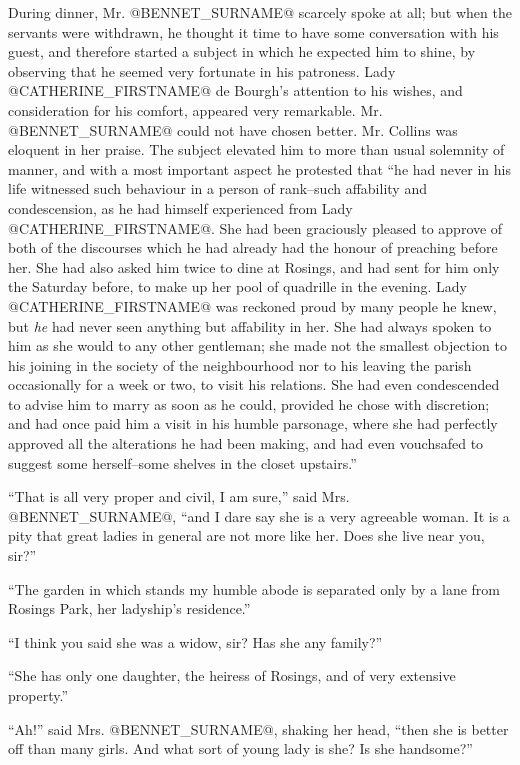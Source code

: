 During dinner, Mr. @BENNET_SURNAME@ scarcely spoke at all; but when the servants
were withdrawn, he thought it time to have some conversation with his
guest, and therefore started a subject in which he expected him to
shine, by observing that he seemed very fortunate in his patroness. Lady
@CATHERINE_FIRSTNAME@ de Bourgh's attention to his wishes, and consideration for
his comfort, appeared very remarkable. Mr. @BENNET_SURNAME@ could not have chosen
better. Mr. Collins was eloquent in her praise. The subject elevated him
to more than usual solemnity of manner, and with a most important aspect
he protested that ``he had never in his life witnessed such behaviour in
a person of rank--such affability and condescension, as he had himself
experienced from Lady @CATHERINE_FIRSTNAME@. She had been graciously pleased to
approve of both of the discourses which he had already had the honour of
preaching before her. She had also asked him twice to dine at Rosings,
and had sent for him only the Saturday before, to make up her pool of
quadrille in the evening. Lady @CATHERINE_FIRSTNAME@ was reckoned proud by many
people he knew, but \textit{he} had never seen anything but affability in her.
She had always spoken to him as she would to any other gentleman; she
made not the smallest objection to his joining in the society of the
neighbourhood nor to his leaving the parish occasionally for a week or
two, to visit his relations. She had even condescended to advise him to
marry as soon as he could, provided he chose with discretion; and had
once paid him a visit in his humble parsonage, where she had perfectly
approved all the alterations he had been making, and had even vouchsafed
to suggest some herself--some shelves in the closet upstairs.''

``That is all very proper and civil, I am sure,'' said Mrs. @BENNET_SURNAME@, ``and
I dare say she is a very agreeable woman. It is a pity that great ladies
in general are not more like her. Does she live near you, sir?''

``The garden in which stands my humble abode is separated only by a lane
from Rosings Park, her ladyship's residence.''

``I think you said she was a widow, sir? Has she any family?''

``She has only one daughter, the heiress of Rosings, and of very
extensive property.''

``Ah!'' said Mrs. @BENNET_SURNAME@, shaking her head, ``then she is better off than
many girls. And what sort of young lady is she? Is she handsome?''

